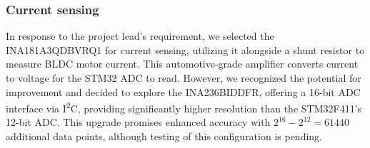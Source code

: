 \subsubsection{Current sensing}\label{Current Sensing}
In response to the project lead's requirement, we selected the INA181A3QDBVRQ1\cite{ti-ina181-q1} for current sensing, utilizing it alongside a shunt resistor to measure BLDC motor\cite{reichelt-motor-datasheet} current. This automotive-grade amplifier converts current to voltage for the STM32\cite{stm32-base-board} ADC to read. However, we recognized the potential for improvement and decided to explore the INA236BIDDFR\cite{ti-ina236-datasheet}, offering a 16-bit ADC interface via I\textsuperscript{2}C, providing significantly higher resolution than the STM32F411's\cite{stm32-base-board} 12-bit ADC. This upgrade promises enhanced accuracy with \(2^{16}-2^{12}=61440\) additional data points, although testing of this configuration is pending.